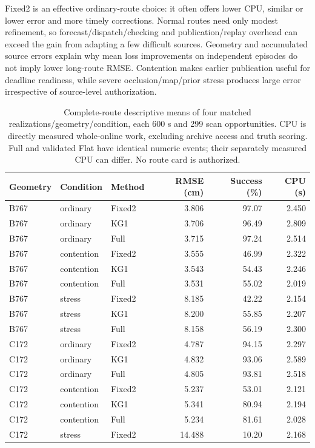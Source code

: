 Fixed2 is an effective ordinary-route choice: it often offers lower CPU, similar or lower error and more timely corrections. Normal routes need only modest refinement, so forecast/dispatch/checking and publication/replay overhead can exceed the gain from adapting a few difficult sources. Geometry and accumulated source errors explain why mean loss improvements on independent episodes do not imply lower long-route RMSE. Contention makes earlier publication useful for deadline readiness, while severe occlusion/map/prior stress produces large error irrespective of source-level authorization.
\begin{table}[!htbp]\centering\small
\caption{Complete-route descriptive means of four matched realizations/geometry/condition, each 600 s and 299 scan opportunities. CPU is directly measured whole-online work, excluding archive access and truth scoring. Full and validated Flat have identical numeric events; their separately measured CPU can differ. No route card is authorized.}\label{tab:r8-route}
\begin{tabular}{@{}lllrrr@{}}\toprule
Geometry & Condition & Method & RMSE (cm) & Success (\%) & CPU (s)\\\midrule
B767 & ordinary & Fixed2 & 3.806 & 97.07 & 2.450\\
B767 & ordinary & KG1 & 3.706 & 96.49 & 2.809\\
B767 & ordinary & Full & 3.715 & 97.24 & 2.514\\
B767 & contention & Fixed2 & 3.555 & 46.99 & 2.322\\
B767 & contention & KG1 & 3.543 & 54.43 & 2.246\\
B767 & contention & Full & 3.531 & 55.02 & 2.019\\
B767 & stress & Fixed2 & 8.185 & 42.22 & 2.154\\
B767 & stress & KG1 & 8.200 & 55.85 & 2.207\\
B767 & stress & Full & 8.158 & 56.19 & 2.300\\
C172 & ordinary & Fixed2 & 4.787 & 94.15 & 2.297\\
C172 & ordinary & KG1 & 4.832 & 93.06 & 2.589\\
C172 & ordinary & Full & 4.805 & 93.81 & 2.518\\
C172 & contention & Fixed2 & 5.237 & 53.01 & 2.121\\
C172 & contention & KG1 & 5.341 & 80.94 & 2.194\\
C172 & contention & Full & 5.234 & 81.61 & 2.028\\
C172 & stress & Fixed2 & 14.488 & 10.20 & 2.168\\

\end{tabular}
\end{table}
